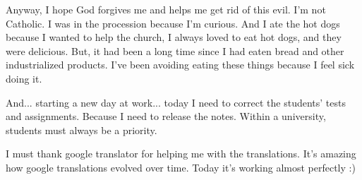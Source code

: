 \documentclass{book}
\begin{document}
Anyway, I hope God forgives me and helps me get rid of this evil. I'm not Catholic. I was in the procession because I'm curious. And I ate the hot dogs because I wanted to help the church, I always loved to eat hot dogs, and they were delicious. But, it had been a long time since I had eaten bread and other industrialized products. I've been avoiding eating these things because I feel sick doing it.

And... starting a new day at work... today I need to correct the students' tests and assignments. Because I need to release the notes. Within a university, students must always be a priority.

I must thank google translator for helping me with the translations. It's amazing how google translations evolved over time. Today it's working almost perfectly :) 
\end{document}
